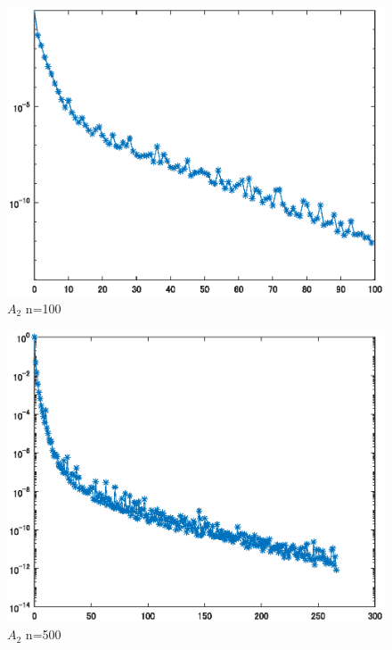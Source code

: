\documentclass[titlepage, a4paper, 11pt, dvipdfmx]{jsarticle}
\begin{document}
\begin{figure}[H]
    \begin{center}%
      \includegraphics[width=13.5cm]{./graphics/CG/100.eps}
    \caption{$A_2$ n=100}
    \label{Label}%
    \end{center}
  \end{figure}

  \begin{figure}[H]
    \begin{center}%
      \includegraphics[width=13.5cm]{./graphics/CG/500.eps}
    \caption{$A_2$ n=500}
    \label{Label}%
    \end{center}
  \end{figure}
\end{document}
